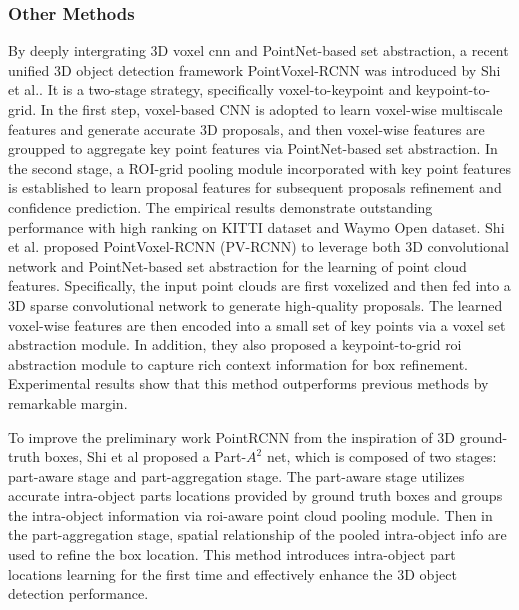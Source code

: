 \subsubsection{Other Methods}
By deeply intergrating 3D voxel \acrshort{cnn} and PointNet-based set abstraction, a recent unified 3D object detection framework PointVoxel-RCNN was introduced by Shi et al.\cite{shi_pv-rcnn_2021}. It is a two-stage strategy, specifically voxel-to-keypoint and keypoint-to-grid. In the first step, voxel-based CNN is adopted to learn voxel-wise multiscale features and generate accurate 3D proposals, and then voxel-wise features are groupped to aggregate key point features via PointNet-based set abstraction. In the second stage,  a ROI-grid pooling module incorporated with key point features is established to learn proposal features for subsequent proposals refinement and confidence prediction. The empirical results demonstrate outstanding performance with high ranking on KITTI dataset and Waymo Open dataset\cite{sun_scalability_2020}.
Shi et al.\cite{shi_pv-rcnn_2021} proposed PointVoxel-RCNN (PV-RCNN) to leverage both 3D convolutional network and PointNet-based set abstraction for the learning of point cloud features. Specifically, the input point clouds are first voxelized and then fed into a 3D sparse convolutional network to generate high-quality proposals. The learned voxel-wise features are then encoded into a small set of key points via a voxel set abstraction module. In addition, they also proposed a keypoint-to-grid \acrshort{roi} abstraction module to capture rich context information for box refinement. Experimental results show that this method outperforms previous methods by remarkable margin. 

To improve the preliminary work PointRCNN from the inspiration of 3D ground-truth boxes, Shi et al proposed a Part-\(A^{2}\) net\cite{shi_points_2020}, which is composed of two stages: part-aware stage and part-aggregation stage. The part-aware stage utilizes accurate intra-object parts locations provided by ground truth boxes and groups the intra-object information via \acrshort{roi}-aware point cloud pooling module. Then in the part-aggregation stage, spatial relationship of the pooled intra-object info are used to refine the box location. This method introduces intra-object part locations learning for the first time and effectively enhance the 3D object detection performance.

